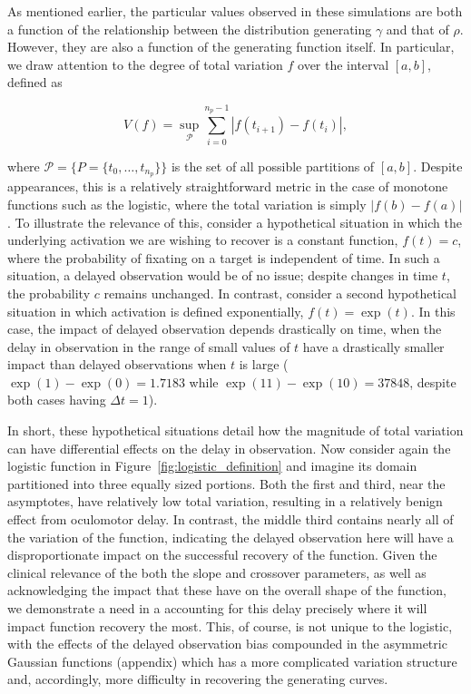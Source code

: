 \documentclass{article}
\begin{document}
As mentioned earlier, the particular values observed in these simulations are both a function of the relationship between the distribution generating $\gamma$ and that of $\rho$. However, they are also a function of the generating function itself. In particular, we draw attention to the degree of total variation $f$ over the interval $[a,b]$, defined as 

\begin{equation}
V(f) = \underset{\mathcal{P}}{\sup} \sum_{i=0}^{n_p-1} \left|f(t_{i+1}) - f(t_i) \right|,
\end{equation}

where $\mathcal{P} = \{P = \{t_0, \dots, t_{n_p}\} \}$ is the set of all possible partitions of $[a,b]$. Despite appearances, this is a relatively straightforward metric in the case of monotone functions such as the logistic, where the total variation is simply $|f(b) - f(a)|$. To illustrate the relevance of this, consider a hypothetical situation in which the underlying activation we are wishing to recover is a constant function, $f(t) = c$, where the probability of fixating on a target is independent of time. In such a situation, a delayed observation would be of no issue; despite changes in time $t$, the probability $c$ remains unchanged. In contrast, consider a second hypothetical situation in which activation is defined exponentially, $f(t) = \exp(t)$. In this case, the impact of delayed observation depends drastically on time, when the delay in observation in the range of small values of $t$ have a drastically smaller impact than delayed observations when $t$ is large ($\exp(1) - \exp(0) = 1.7183$ while $\exp(11) - \exp(10) = 37848$, despite both cases having $\Delta t = 1$).

In short, these hypothetical situations detail how the magnitude of total variation can have differential effects on the delay in observation. Now consider again the logistic function in Figure~\ref{fig:logistic_definition} and imagine its domain partitioned into three equally sized portions. Both the first and third, near the asymptotes, have relatively low total variation, resulting in a relatively benign effect from oculomotor delay. In contrast, the middle third contains nearly all of the variation of the function, indicating the delayed observation here will have a disproportionate impact on the successful recovery of the function. Given the clinical relevance of the both the slope and crossover parameters, as well as acknowledging the impact that these have on the overall shape of the function, we demonstrate a need in a accounting for this delay precisely where it will impact function recovery the most. This, of course, is not unique to the logistic, with the effects of the delayed observation bias compounded in the asymmetric Gaussian functions (appendix) which has a more complicated variation structure and, accordingly, more difficulty in recovering the generating curves.


%
\end{document}
